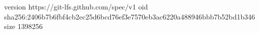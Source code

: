 version https://git-lfs.github.com/spec/v1
oid sha256:2406b7b6fbf4cb2ec25d6bcd76ef3e7570eb3ac6220a488946bbb7b52bd1b346
size 1398256
